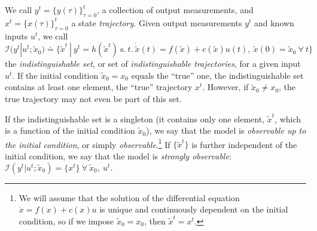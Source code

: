 We call $y^t = \{y(\tau)\}_{\tau = 0}^t$, a collection of output measurements, and $x^t = \{x(\tau)\}_{\tau = 0}^t$ a state {\em trajectory}. Given output measurements $y^t$ and known inputs $u^t$, we call 
\begin{equation}
{\mathcal I}(y^t | u^t; \tilde x_0) \doteq \{ {\tilde x}^t \ | \ y^t = h({\tilde x}^t) \ {\mathrm s. \ t. } \ \dot {\tilde x}(t) = f({\tilde x}) + c({\tilde x}) u(t), \ \tilde x(0) = \tilde x_0  \ \forall \ t\}
\end{equation}
the {\em indistinguishable set}, or set of {\em indistinguishable trajectories}, for a given input $u^t$. If the initial condition $\tilde x_0 = x_0$ equals the ``true'' one, the indistinguishable set contains at least one element, the ``true'' trajectory $x^t$. However, if $\tilde x_0 \neq x_0$, the true trajectory may not even be part of this set.

If the indistinguishable set is a singleton (it contains only one element, $\tilde x^t$, which is a function of the initial condition $\tilde x_0$), we say that the model is {\em observable up to the initial condition}, or simply {\em observable}.\footnote{We will assume that the solution of the differential equation $\dot x = f(x) + c(x) u$ is unique and continuously dependent on the initial condition, so if we impose $\tilde x_0 = x_0$, then $\tilde x^t = x^t$.} If $\{\tilde x^t\}$ is further independent of the initial condition, we say that the model is {\em strongly observable}:
$
{\mathcal I}(y^t | u^t; \tilde x_0) = \{ x^t\} \ \forall \ \tilde x_0, \ u^t. 
$

\iffalse
If the indistinguishable set is not a singleton, but the collection of trajectories form an equivalence class under different initial conditions, we say that the model is {\em observable up to the initial condition}. For instance, we may have that $x^t$ is in the form $x(t) = \phi(t)x_0$ and indistinguishable trajectories are of the form $\tilde x(t) = \phi(t) \tilde x_0$, for the same $\phi(t)$, for all $t$. In this case, if we consider equivalent trajectories that differ solely by their initial condition, we have that the indistinguishable set is made of equivalence classes (under the Gauge transformation defined by the initial conditions), and we say that the model is observable up to the initial condition if the indistinguishable set is a single equivalence class. Note that, in this case, we can fix the initial condition arbitrarily (canonization), say to $\tilde x_0$, and obtain a singleton indistinguishable set that does {\em not} the true trajectory, but one that is related to it by {\em gauge 
transformation}. We will defer the treatment to the initial condition to Sect. \ref{sect-gauge}, and neglect $x_0$ in the meantime. 
\fi

